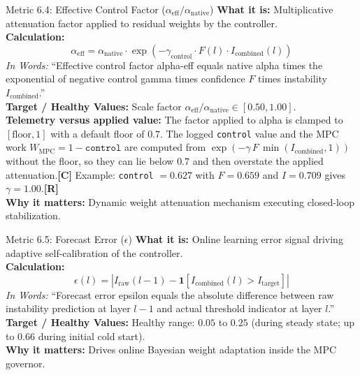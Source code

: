 \documentclass[11pt,a4paper]{article}
\newcommand{\sR}{\textbf{[R]}}
\newcommand{\sC}{\textbf{[C]}}
\begin{document}
\begin{metricbox}{Metric 6.4: Effective Control Factor ($\alpha_{\text{eff}} / \alpha_{\text{native}}$)}
\textbf{What it is:} Multiplicative attenuation factor applied to residual weights by the controller.\\
\textbf{Calculation:}
 $$\alpha_{\text{eff}} = \alpha_{\text{native}} \cdot \exp\left(-\gamma_{\text{control}} \cdot F(l) \cdot I_{\text{combined}}(l)\right)$$ \emph{In Words:} ``Effective control factor alpha-eff equals native alpha times the exponential of negative control gamma times confidence $F$ times instability $I_{\text{combined}}$.''\\
\textbf{Target / Healthy Values:} Scale factor $\alpha_{\text{eff}} / \alpha_{\text{native}} \in [0.50, 1.00]$.\\
\textbf{Telemetry versus applied value:} The factor applied to alpha is clamped to $[\text{floor}, 1]$ with a default floor of $0.7$. The logged \texttt{control} value and the MPC work $W_{\text{MPC}} = 1 - \texttt{control}$ are computed from $\exp(-\gamma\,F\,\min(I_{\text{combined}},1))$ without the floor, so they can lie below $0.7$ and then overstate the applied attenuation.\sC{} Example: \texttt{control} $= 0.627$ with $F = 0.659$ and $I = 0.709$ gives $\gamma = 1.00$.\sR{}\\
\textbf{Why it matters:} Dynamic weight attenuation mechanism executing closed-loop stabilization.
\end{metricbox}

\begin{metricbox}{Metric 6.5: Forecast Error ($\epsilon$)}
\textbf{What it is:} Online learning error signal driving adaptive self-calibration of the controller.\\
\textbf{Calculation:}
 $$\epsilon(l) = \left|I_{\text{raw}}(l-1) - \mathbf{1}\left[I_{\text{combined}}(l) > I_{\text{target}}\right]\right|$$ \emph{In Words:} ``Forecast error epsilon equals the absolute difference between raw instability prediction at layer $l-1$ and actual threshold indicator at layer $l$.''\\
\textbf{Target / Healthy Values:} Healthy range: $0.05$ to $0.25$ (during steady state; up to $0.66$ during initial cold start).\\
\textbf{Why it matters:} Drives online Bayesian weight adaptation inside the MPC governor.
\end{metricbox}
\end{document}
